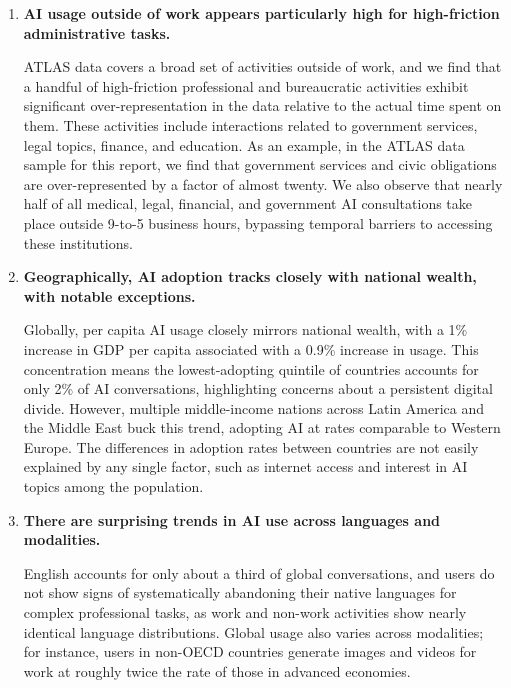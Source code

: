 \documentclass[11pt,a4paper]{article}
\begin{document}
\begin{enumerate}
    \item \textbf{AI usage outside of work appears particularly high for high-friction administrative tasks.} 
    
    ATLAS data covers a broad set of activities outside of work, and we find that a handful of high-friction professional and bureaucratic activities exhibit significant over-representation in the data relative to the actual time spent on them. These activities include interactions related to government services, legal topics, finance, and education. As an example, in the ATLAS data sample for this report, we find that government services and civic obligations are over-represented by a factor of almost twenty. We also observe that nearly half of all medical, legal, financial, and government AI consultations take place outside 9-to-5 business hours, bypassing temporal barriers to accessing these institutions.

    \item \textbf{Geographically, AI adoption tracks closely with national wealth, with notable exceptions.} 
    
    Globally, per capita AI usage closely mirrors national wealth, with a 1\% increase in GDP per capita associated with a 0.9\% increase in usage. This concentration means the lowest-adopting quintile of countries accounts for only 2\% of AI conversations, highlighting concerns about a persistent digital divide. However, multiple middle-income nations across Latin America and the Middle East buck this trend, adopting AI at rates comparable to Western Europe. The differences in adoption rates between countries are not easily explained by any single factor, such as internet access and interest in AI topics among the population.

    \item \textbf{There are surprising trends in AI use across languages and modalities.} 
    
    English accounts for only about a third of global conversations, and users do not show signs of systematically abandoning their native languages for complex professional tasks, as work and non-work activities show nearly identical language distributions. Global usage also varies across modalities; for instance, users in non-OECD countries generate images and videos for work at roughly twice the rate of those in advanced economies.
\end{enumerate}
\end{document}
